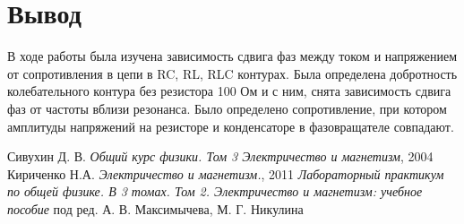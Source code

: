 \documentclass[12pt,a4paper]{article}
\begin{document}
\section*{Вывод}

В ходе работы была изучена зависимость сдвига фаз между током и напряжением от сопротивления в цепи в RC, RL, RLC контурах. Была определена добротность колебательного контура без резистора 100 Ом и с ним, снята зависимость сдвига фаз от частоты вблизи резонанса.
Было определено сопротивление, при котором амплитуды напряжений на резисторе и конденсаторе в фазовращателе совпадают.

\newpage
\begin{thebibliography}{9}
	 Сивухин Д. В. \emph{Общий курс физики. Том 3 Электричество и магнетизм}, 2004
	 Кириченко Н.А. \emph{Электричество и магнетизм.}, 2011
	 \emph{Лабораторный практикум по общей физике. В 3 томах. Том 2. Электричество и магнетизм: учебное пособие} под ред. А. В. Максимычева, М. Г. Никулина
\end{thebibliography}
\end{document}

